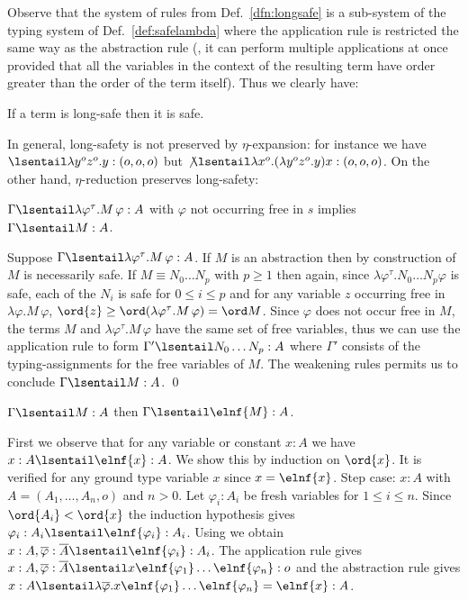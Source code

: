 Observe that the system of rules from Def.~\ref{dfn:longsafe} is a sub-system of the typing system of Def.~\ref{def:safelambda} where the application rule is  restricted the same way as the abstraction rule (\ie, it can perform multiple applications at once provided that all the variables in the context of the resulting term have order greater than the order of the term itself). Thus we clearly have:
\begin{lemma}
\label{lem:longsafe_imp_safe}
If a term is long-safe then it is safe.
\end{lemma}
\smallskip

In general, long-safety is not preserved by $\eta$-expansion: for
instance we have
$\lsentail \lambda y^o z^o . y : (o,o,o)$ but
$\not \lsentail\lambda x^o . (\lambda y^o z^o . y) x : (o,o,o)$.
On the other hand,  $\eta$-reduction preserves long-safety:

\begin{lemma}
\label{lem:etared_preserve_longsafety}
  $\Gamma \lsentail \lambda \varphi^\tau . M\, \varphi :A $ with $\varphi$ not
  occurring free in $s$ implies $\Gamma \lsentail M :A$.
\end{lemma}
\proof
  Suppose $\Gamma \lsentail \lambda \varphi^\tau . M\, \varphi :A$. If $M$ is an  abstraction then by construction of $M$ is necessarily safe.  If $M \equiv N_0 \ldots N_p$ with
  $p\geq 1$ then again, since $\lambda \varphi^\tau . N_0 \ldots N_p
  \varphi$ is safe, each of the $N_i$ is safe for $0 \leq i \leq p$
  and for any variable $z$ occurring free in $\lambda \varphi . M\, \varphi$, $\ord{z} \geq \ord(\lambda \varphi^\tau . M\, \varphi) = \ord M$. Since  $\varphi$ does not occur free in $M$, the terms $M$ and $\lambda \varphi^\tau . M\, \varphi$ have the same set of free variables, thus we can use the application rule to form $\Gamma' \lsentail N_0 \ldots N_p : A$ where $\Gamma'$ consists of the typing-assignments for the free variables of $M$. The weakening rules permits us to conclude $\Gamma \lsentail M :A$. \qed
\smallskip

\begin{lemma}
\label{lem:longsafe_imp_elnf_longsafe}
$\Gamma \lsentail M :A$ then $\Gamma \lsentail \elnf{M} :A$.
\end{lemma}
\proof
 First we observe that for any variable or constant $x:A$ we have $x:A \lsentail \elnf{x} :A$. We show this by induction on $\ord{x}$.
It is verified for any ground type variable $x$
since $x = \elnf{x}$.
Step case: $x:A$ with $A=(A_1, \ldots, A_n,o)$ and $n>0$. Let $\varphi_i:A_i$ be fresh variables for $1\leq i\leq n$.
Since $\ord{A_i} < \ord{x}$ the induction hypothesis gives $\varphi_i :A_i \lsentail \elnf{\varphi_i} : A_i$. Using  we obtain $x:A, \overline{\varphi} : \overline{A}
  \lsentail \elnf{\varphi_i} :A_i$.  The application rule gives $x :A, \overline{\varphi} : \overline{A} \lsentail x \elnf{\varphi_1} \ldots \elnf{\varphi_n}
  : o$ and the abstraction rule gives $ x :A \lsentail \lambda
  \overline{\varphi} . x \elnf{\varphi_1} \ldots \elnf{\varphi_n} =
  \elnf{x} :A$.


